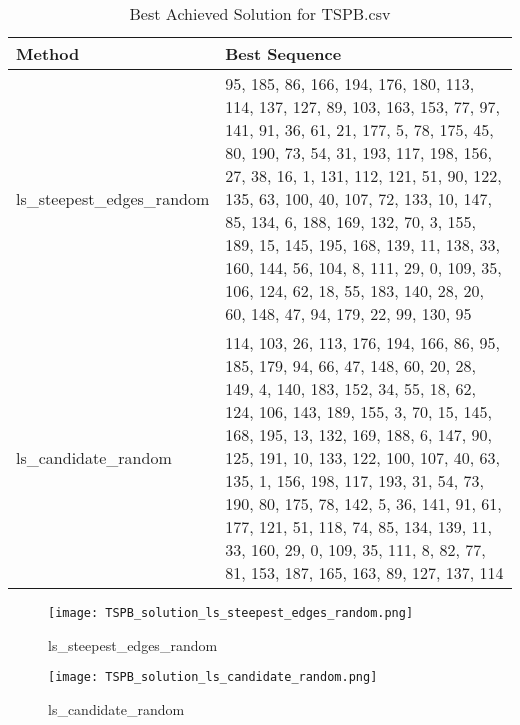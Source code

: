 \begin{table}[H] %
\centering
\caption{Best Achieved Solution for TSPB.csv}
\label{tab:tsbp_best_sequence}
\begin{tabular}{|p{0.25\linewidth}|p{0.75\linewidth}|} %
\hline
\textbf{Method} & \textbf{Best Sequence} \\
\hline
ls\_steepest\_edges\_random & 95, 185, 86, 166, 194, 176, 180, 113, 114, 137, 127, 89, 103, 163, 153, 77, 97, 141, 91, 36, 61, 21, 177, 5, 78, 175, 45, 80, 190, 73, 54, 31, 193, 117, 198, 156, 27, 38, 16, 1, 131, 112, 121, 51, 90, 122, 135, 63, 100, 40, 107, 72, 133, 10, 147, 85, 134, 6, 188, 169, 132, 70, 3, 155, 189, 15, 145, 195, 168, 139, 11, 138, 33, 160, 144, 56, 104, 8, 111, 29, 0, 109, 35, 106, 124, 62, 18, 55, 183, 140, 28, 20, 60, 148, 47, 94, 179, 22, 99, 130, 95 \\
\hline
ls\_candidate\_random & 114, 103, 26, 113, 176, 194, 166, 86, 95, 185, 179, 94, 66, 47, 148, 60, 20, 28, 149, 4, 140, 183, 152, 34, 55, 18, 62, 124, 106, 143, 189, 155, 3, 70, 15, 145, 168, 195, 13, 132, 169, 188, 6, 147, 90, 125, 191, 10, 133, 122, 100, 107, 40, 63, 135, 1, 156, 198, 117, 193, 31, 54, 73, 190, 80, 175, 78, 142, 5, 36, 141, 91, 61, 177, 121, 51, 118, 74, 85, 134, 139, 11, 33, 160, 29, 0, 109, 35, 111, 8, 82, 77, 81, 153, 187, 165, 163, 89, 127, 137, 114 \\
\hline
\end{tabular}
\end{table}

\begin{figure}[!htbp]
\centering
\texttt{[image: TSPB\_solution\_ls\_steepest\_edges\_random.png]}
\caption{\label{fig:frog}ls\_steepest\_edges\_random}
\end{figure}

\begin{figure}[!htbp]
\centering
\texttt{[image: TSPB\_solution\_ls\_candidate\_random.png]}
\caption{\label{fig:frog}ls\_candidate\_random}
\end{figure}